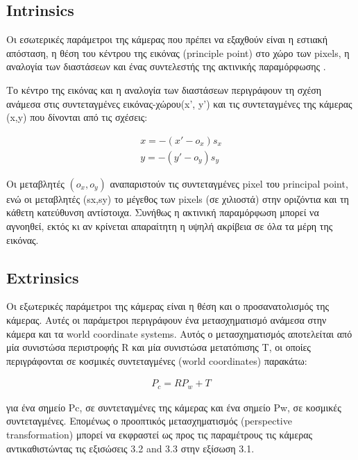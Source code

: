 \subsection{Intrinsics}

Οι εσωτερικές παράμετροι της κάμερας που πρέπει να εξαχθούν είναι η εστιακή απόσταση, η θέση του κέντρου της εικόνας (principle point) στο χώρο των pixels, η αναλογία των διαστάσεων και ένας συντελεστής της ακτινικής παραμόρφωσης \cite{Malik2002}. 



Το κέντρο της εικόνας και η αναλογία των διαστάσεων περιγράφουν τη σχέση ανάμεσα στις συντεταγμένες εικόνας-χώρου(x', y') και τις συντεταγμένες της κάμερας (x,y) που δίνονται από τις σχέσεις:

\begin{equation}
\begin{aligned}
x=-(x'-o_{x})s_{x}
\\
y=-(y'-o_{y})s_{y}
\end{aligned}
\end{equation}

Οι μεταβλητές $(o_{x},o_{y})$ αναπαριστούν τις συντεταγμένες pixel του principal point, ενώ οι μεταβλητές (sx,sy) το μέγεθος των pixels (σε χιλιοστά) στην οριζόντια και τη κάθετη κατεύθυνση αντίστοιχα.
Συνήθως η ακτινική παραμόρφωση μπορεί να αγνοηθεί, εκτός κι αν κρίνεται απαραίτητη η υψηλή ακρίβεια σε όλα τα μέρη της εικόνας. 


\subsection{Extrinsics}

Οι εξωτερικές παράμετροι της κάμερας είναι η θέση και ο προσανατολισμός της κάμερας. Αυτές οι παράμετροι περιγράφουν ένα μετασχηματισμό ανάμεσα στην κάμερα και τα world coordinate systems.
Αυτός ο μετασχηματισμός αποτελείται από μία συνιστώσα περιστροφής R και μία συνιστώσα μετατόπισης T, οι οποίες περιγράφονται σε κοσμικές συντεταγμένες (world coordinates) παρακάτω:

\begin{equation}
\begin{aligned}
P_{c} = RP_{w}+T
\end{aligned}
\end{equation}

για ένα σημείο Pc, σε συντεταγμένες της κάμερας και ένα σημείο Pw, σε κοσμικές συντεταγμένες. Επομένως ο προοπτικός μετασχηματισμός (perspective transformation) μπορεί να εκφραστεί ως προς τις παραμέτρους τις κάμερας αντικαθιστώντας τις εξισώσεις 3.2 and 3.3 στην εξίσωση 3.1. 


